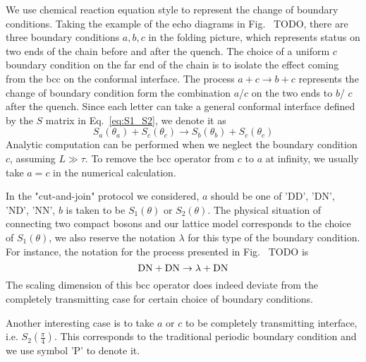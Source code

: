 
We use chemical reaction equation style to represent the change of boundary conditions. Taking the example of the echo diagrams in Fig.~{\color{red} TODO}, there are three boundary conditions $a,b,c$ in the folding picture, which represents status on two ends of the chain before and after the quench. The choice of a uniform $c$ boundary condition on the far end of the chain is to isolate the effect coming from the bcc on the conformal interface. The process $a + c \rightarrow b + c$ represents the change of boundary condition form the combination $a$/$c$ on the two ends to $b$/ $c$ after the quench. Since each letter can take a general conformal interface defined by the $S$ matrix in Eq.~\eqref{eq:S1_S2}, we denote it as
\begin{equation}
S_a( \theta_a ) + S_c( \theta_c) \rightarrow S_b( \theta_b )  + S_c( \theta_c ) 
\end{equation}
Analytic computation can be performed when we neglect the boundary condition $c$, assuming $L \gg \tau$. To remove the bcc operator from $c$ to $a$ at infinity, we usually take $a = c$ in the numerical calculation. 

In the "cut-and-join" protocol we considered, $a$ should be one of 'DD', 'DN', 'ND', 'NN', $b$ is taken to be $S_1( \theta )$ or $S_2( \theta )$. The physical situation of connecting two compact bosons and our lattice model corresponds to the choice of $S_1( \theta)$, we also reserve the notation $\lambda$ for this type of the boundary condition. For instance, the notation for the process presented in Fig.~{\color{red} TODO} is
\begin{equation}
{\rm DN }  + {\rm DN} \rightarrow \lambda + { \rm DN} 
\end{equation}
The scaling dimension of this bcc operator does indeed deviate from the completely transmitting case for certain choice of boundary conditions. 

Another interesting case is to take $a$ or $c$ to be completely transmitting interface, i.e. $S_2( \frac{\pi}{4} )$. This corresponds to the traditional periodic boundary condition and we use symbol 'P' to denote it. 


